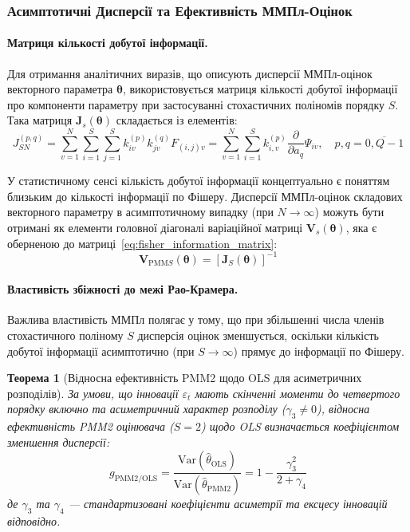 \documentclass[12pt,a4paper]{article}
\newtheorem{theorem}{Теорема}[section]
\begin{document}
\subsubsection{Асимптотичні Дисперсії та Ефективність ММПл-Оцінок}

\paragraph{Матриця кількості добутої інформації.}

Для отримання аналітичних виразів, що описують дисперсії ММПл-оцінок векторного параметра $\boldsymbol{\theta}$, використовується матриця кількості добутої інформації про компоненти параметру при застосуванні стохастичних поліномів порядку $S$. Така матриця $\mathbf{J}_s(\boldsymbol{\theta})$ складається із елементів:
\begin{equation}
\label{eq:fisher_information_matrix}
J_{SN}^{(p,q)} = \sum_{v=1}^{N} \sum_{i=1}^{S} \sum_{j=1}^{S} k_{iv}^{(p)} k_{jv}^{(q)} F_{(i,j)v} = \sum_{v=1}^{N} \sum_{i=1}^{S} k_{i,v}^{(p)} \frac{\partial}{\partial a_q} \Psi_{iv}, \quad p,q=\overline{0,Q-1}
\end{equation}

У статистичному сенсі кількість добутої інформації концептуально є поняттям близьким до кількості інформації по Фішеру. Дисперсії ММПл-оцінок складових векторного параметру в асимптотичному випадку (при $N \to \infty$) можуть бути отримані як елементи головної діагоналі варіаційної матриці $\mathbf{V}_s(\boldsymbol{\theta})$, яка є оберненою до матриці~\eqref{eq:fisher_information_matrix}:
\begin{equation}
\label{eq:variance_matrix}
\mathbf{V}_{\text{PMM}S}(\boldsymbol{\theta}) = \left[\mathbf{J}_S(\boldsymbol{\theta})\right]^{-1}
\end{equation}

\paragraph{Властивість збіжності до межі Рао-Крамера.}

Важлива властивість ММПл полягає у тому, що при збільшенні числа членів стохастичного поліному $S$ дисперсія оцінок зменшується, оскільки кількість добутої інформації асимптотично (при $S \to \infty$) прямує до інформації по Фішеру.

\begin{theorem}[Відносна ефективність PMM2 щодо OLS для асиметричних розподілів]
\label{thm:relative_efficiency_pmm2}
За умови, що інновації $\varepsilon_t$ мають скінченні моменти до четвертого порядку включно та асиметричний характер розподілу ($\gamma_3 \neq 0$), відносна ефективність PMM2 оцінювача ($S=2$) щодо OLS визначається коефіцієнтом зменшення дисперсії:
\begin{equation}
\label{eq:re_pmm2_ols}
g_{\text{PMM2/OLS}} = \frac{\text{Var}(\hat{\theta}_{\text{OLS}})}{\text{Var}(\hat{\theta}_{\text{PMM2}})} = 1 - \frac{\gamma_3^2}{2 + \gamma_4}
\end{equation}
де $\gamma_3$ та $\gamma_4$ --- стандартизовані коефіцієнти асиметрії та ексцесу інновацій відповідно.
\end{theorem}
\end{document}
